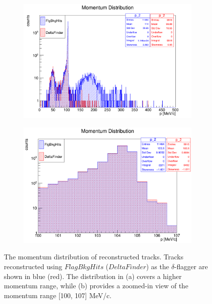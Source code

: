 \begin{figure}[!h]
    \begin{subfigure}[b]{0.5\textwidth}
        \centering
        \includegraphics[width = 1.1\textwidth]{figures/png/Screenshot_20240820_162125.png}
        \subcaption{}
        \label{fig:highlevel1}
    \end{subfigure}
    \begin{subfigure}[b]{0.5\textwidth}
        \centering
        \includegraphics[width = 1.1\textwidth]{figures/png/Screenshot_20240820_160904.png}
        \subcaption{}
        \label{fig:highlevel2}
    \end{subfigure}
    \caption[Momentum distribution of reconstructed tracks.]{The momentum distribution of reconstructed tracks. 
    Tracks reconstructed using $FlagBkgHits$ ($DeltaFinder$) 
    as the $\delta$-flagger are shown in blue (red). 
    The distribution in (a) covers a higher momentum range, while (b) 
    provides a zoomed-in view of the momentum range [100, 107] MeV/c.}
    \label{fig:highlevel} 
\end{figure}


